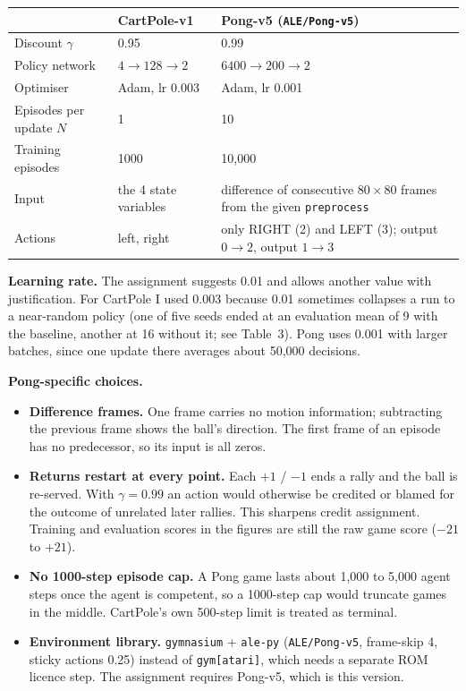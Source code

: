 \documentclass[10pt,a4paper]{article}
\newcommand{\code}[1]{\texttt{#1}}
\newcommand{\hd}[1]{\cellcolor{head}\textbf{#1}}
\begin{document}
\begin{center}
\begin{tabular}{p{3.6cm}p{4.4cm}p{7.6cm}}
\hline
 & \hd{CartPole-v1} & \hd{Pong-v5 (\code{ALE/Pong-v5})} \\
\hline
Discount $\gamma$ & 0.95 & 0.99 \\
Policy network & $4\to128\to2$ & $6400\to200\to2$ \\
Optimiser & Adam, lr 0.003 & Adam, lr 0.001 \\
Episodes per update $N$ & 1 & 10 \\
Training episodes & 1000 & 10,000 \\
Input & the 4 state variables & difference of consecutive $80\times80$ frames from the given \code{preprocess} \\
Actions & left, right & only RIGHT (2) and LEFT (3); output $0\to2$, output $1\to3$ \\
\hline
\end{tabular}
\end{center}

\textbf{Learning rate.} The assignment suggests 0.01 and allows another value with justification. For CartPole I used 0.003 because 0.01
sometimes collapses a run to a near-random policy (one of five seeds ended at an evaluation mean of 9 with the baseline, another at 16
without it; see Table~3). Pong uses 0.001 with larger batches, since one update there averages about 50,000 decisions.

\textbf{Pong-specific choices.}
\begin{itemize}
  \item \textbf{Difference frames.} One frame carries no motion information; subtracting the previous frame shows the ball's direction.
        The first frame of an episode has no predecessor, so its input is all zeros.
  \item \textbf{Returns restart at every point.} Each $+1$ / $-1$ ends a rally and the ball is re-served. With $\gamma=0.99$ an action would
        otherwise be credited or blamed for the outcome of unrelated later rallies. This sharpens credit assignment. Training and evaluation
        scores in the figures are still the raw game score ($-21$ to $+21$).
  \item \textbf{No 1000-step episode cap.} A Pong game lasts about 1,000 to 5,000 agent steps once the agent is competent, so a 1000-step cap
        would truncate games in the middle. CartPole's own 500-step limit is treated as terminal.
  \item \textbf{Environment library.} \code{gymnasium} + \code{ale-py} (\code{ALE/Pong-v5}, frame-skip 4, sticky actions 0.25) instead of
        \code{gym[atari]}, which needs a separate ROM licence step. The assignment requires Pong-v5, which is this version.
\end{itemize}
\end{document}
